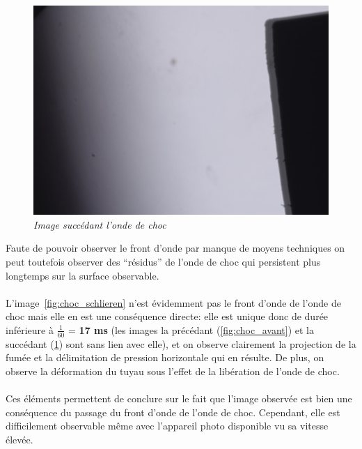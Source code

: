 \begin{figure}[H]
	\centering
	\includegraphics[scale = 0.12]{figures/choc_apres.jpg}
	\caption{\small{\textit{Image succédant l'onde de choc}}}
	\label{fig:choc_apres}
	\end{figure}
Faute de pouvoir observer le front d’onde par manque de moyens techniques on peut toutefois observer des “résidus” de l’onde de choc qui persistent plus longtemps sur la surface observable.\\\\
L’image~\ref{fig:choc_schlieren} n’est évidemment pas le front d’onde de l’onde de choc mais elle en est une conséquence directe: elle est unique donc de durée inférieure à $\frac{1}{60}$ = \textbf{17 ms} (les images la précédant (\ref{fig:choc_avant}) et la succédant (\ref{fig:choc_apres}) sont sans lien avec elle), et on observe clairement la projection de la fumée et la délimitation de pression horizontale qui en résulte.
De plus, on observe la déformation du tuyau sous l’effet de la libération de l’onde de choc.\\\\
Ces éléments permettent de conclure sur le fait que l’image observée est bien une conséquence du passage du front d’onde de l’onde de choc. Cependant, elle est difficilement observable même avec l'appareil photo disponible vu sa vitesse élevée.
